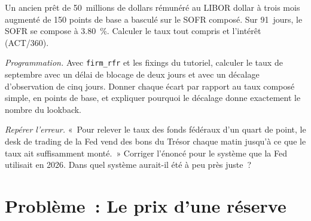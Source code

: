 \begin{exercise}[$\star\star$]\label{exo:m2:central-banks-and-the-short-rate:6}
Un ancien prêt de 50~millions de dollars rémunéré au LIBOR dollar à trois mois
augmenté de 150 points de base a basculé sur le SOFR composé. Sur 91~jours, le
SOFR se compose à 3.80~\%. Calculer le taux tout compris et l'intérêt (ACT/360).
\end{exercise}

\begin{exercise}[$\star\star\star$]\label{exo:m2:central-banks-and-the-short-rate:7}
\emph{Programmation.} Avec \texttt{firm\_rfr} et les fixings du tutoriel,
calculer le taux de septembre avec un délai de blocage de deux jours et avec un
décalage d'observation de cinq jours. Donner chaque écart par rapport au taux
composé simple, en points de base, et expliquer pourquoi le décalage donne exactement le nombre du lookback.
\end{exercise}

\begin{exercise}[$\star\star\star$]\label{exo:m2:central-banks-and-the-short-rate:8}
\emph{Repérer l'erreur.} «~Pour relever le taux des fonds fédéraux d'un quart de
point, le desk de trading de la Fed vend des bons du Trésor chaque matin jusqu'à
ce que le taux ait suffisamment monté.~» Corriger l'énoncé pour le système que la
Fed utilisait en 2026. Dans quel système aurait-il été à peu près juste~?
\end{exercise}

\section{Problème~: Le prix d'une réserve}


